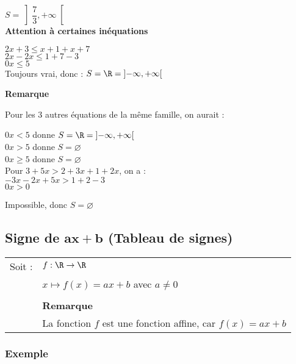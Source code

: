 \hspace*{4cm}$ S = \left]\dfrac{7}{3}, +\infty\right[ $ \\

\textbf{Attention à certaines inéquations}

$ 2x + 3 \leqslant x + 1 + x + 7 $\\

$ 2x - 2x \leqslant 1 + 7 - 3 $\\

$ 0x \leqslant 5 $ \\

Toujours vrai, donc : $ S = \R = \left]-\infty, +\infty\right[ $ \\

\newpage 

\textbf{Remarque}

Pour les 3 autres équations de la même famille, on aurait : 

$ 0x < 5 $ donne $ S = \R = \left]-\infty, +\infty\right[ $\\

$ 0x > 5 $ donne $ S = \varnothing $\\

$ 0x \geqslant 5 $ donne $ S = \varnothing $ \\

Pour $ 3 + 5x > 2 + 3x + 1 + 2x $, on a :\\

$ -3x - 2x + 5x > 1 + 2 - 3 $\\

$ 0x > 0 $ 

Impossible, donc $ S = \varnothing $ \\

\newpage 
\subsection{Signe de $\mathbf{ax+b}$ (Tableau de signes)}

\begin{tabular}{rl}
Soit : & $ f : \R \rightarrow \R$\\
& $ x\mapsto f(x) = ax + b $ avec $ a \neq 0 $ \\
&\\
& \textbf{Remarque}\\
& La fonction $f$ est une fonction affine, car $ f(x) = ax + b $\\
\end{tabular}

\subsubsection{Exemple }

